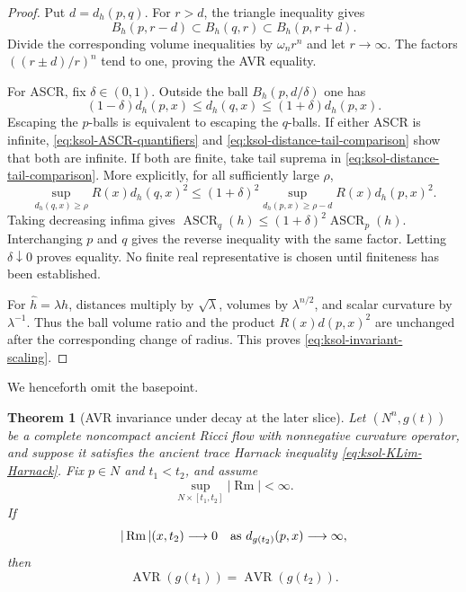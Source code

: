 \documentclass[10pt]{coll-l}
\newtheorem{theorem}{Theorem}[chapter]
\theoremstyle{definition}
\theoremstyle{remark}
\numberwithin{section}{chapter}
\numberwithin{equation}{chapter}
\newcommand{\ASCR}{\operatorname{ASCR}}
\newcommand{\AVR}{\operatorname{AVR}}
\newcommand{\Rm}{\operatorname{Rm}}
\begin{document}
\begin{proof}
Put $d=d_h(p,q)$.  For $r>d$, the triangle inequality gives
\begin{equation}
 B_h(p,r-d)\subset B_h(q,r)\subset B_h(p,r+d).        \label{eq:ksol-basepoint-ball-sandwich}
\end{equation}
Divide the corresponding volume inequalities by $\omega_nr^n$ and let
$r\to\infty$.  The factors $((r\pm d)/r)^n$ tend to one, proving the AVR
equality.

For ASCR, fix $\delta\in(0,1)$.  Outside the ball
$B_h(p,d/\delta)$ one has
\begin{equation}
 (1-\delta)d_h(p,x)\leq d_h(q,x)
       \leq(1+\delta)d_h(p,x).                       \label{eq:ksol-distance-tail-comparison}
\end{equation}
Escaping the $p$-balls is equivalent to escaping the $q$-balls.  If either
ASCR is infinite, \eqref{eq:ksol-ASCR-quantifiers} and
\eqref{eq:ksol-distance-tail-comparison} show that both are infinite.  If
both are finite, take tail suprema in
\eqref{eq:ksol-distance-tail-comparison}.  More explicitly, for all
sufficiently large $\rho$,
\[
 \sup_{d_h(q,x)\geq\rho}R(x)d_h(q,x)^2
 \leq(1+\delta)^2
     \sup_{d_h(p,x)\geq\rho-d}R(x)d_h(p,x)^2.
\]
Taking decreasing infima gives
$\ASCR_q(h)\leq(1+\delta)^2\ASCR_p(h)$.  Interchanging $p$ and $q$ gives
the reverse inequality with the same factor.  Letting
$\delta\downarrow0$ proves equality.  No finite real representative is
chosen until finiteness has been established.

For $\widehat h=\lambda h$, distances multiply by $\sqrt\lambda$, volumes
by $\lambda^{n/2}$, and scalar curvature by $\lambda^{-1}$.  Thus the ball
volume ratio and the product $R(x)d(p,x)^2$ are unchanged after the
corresponding change of radius.  This proves
\eqref{eq:ksol-invariant-scaling}.
\end{proof}

We henceforth omit the basepoint.

\begin{theorem}[AVR invariance under decay at the later slice]
\label{thm:ksol-invariant-in-time}
Let $(N^n,g(t))$ be a complete noncompact ancient Ricci flow with
nonnegative curvature operator, and suppose it satisfies the ancient trace
Harnack inequality \eqref{eq:ksol-KLim-Harnack}.  Fix $p\in N$ and
$t_1<t_2$, and assume
\begin{equation}
             \sup_{N\times[t_1,t_2]}|\Rm|<\infty.    \label{eq:ksol-AVR-slab-bound}
\end{equation}
If
\begin{equation}
 |\Rm|(x,t_2)\longrightarrow0
 \quad\hbox{as }d_{g(t_2)}(p,x)\longrightarrow\infty,  \label{eq:ksol-final-slice-curvature-decay}
\end{equation}
then
\begin{equation}
                         \AVR(g(t_1))=\AVR(g(t_2)).    \label{eq:ksol-AVR-time-invariance}
\end{equation}
\end{theorem}
\end{document}
